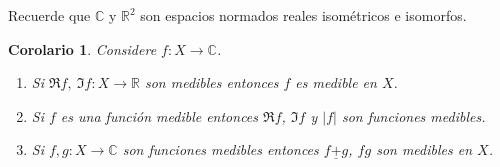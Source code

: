 \documentclass[twoside,12pt,a4 paper,openright]{book}
\newtheorem{cor}[claim]{Corolario}
\begin{document}
Recuerde que $\mathbb C$ y $\mathbb R^2$ son espacios normados reales isom\'etricos e isomorfos.
 
\begin{cor} Considere $f:X \to\mathbb C$.
    \begin{enumerate}
        \item Si $\Re f, \ \Im f :X\to \mathbb R$ son medibles entonces $f$ es medible en $X$.

        \item Si $f $ es una funci\'on  medible   entonces $\Re f$, $\Im f$ y $|f|$ son funciones medibles. 

        \item Si $f, g: X \to \mathbb C$ son funciones  medibles  entonces $f\underline{+}g$, $fg$ son  medibles en $X$.
    \end{enumerate}
\end{cor}


 
\end{document}
